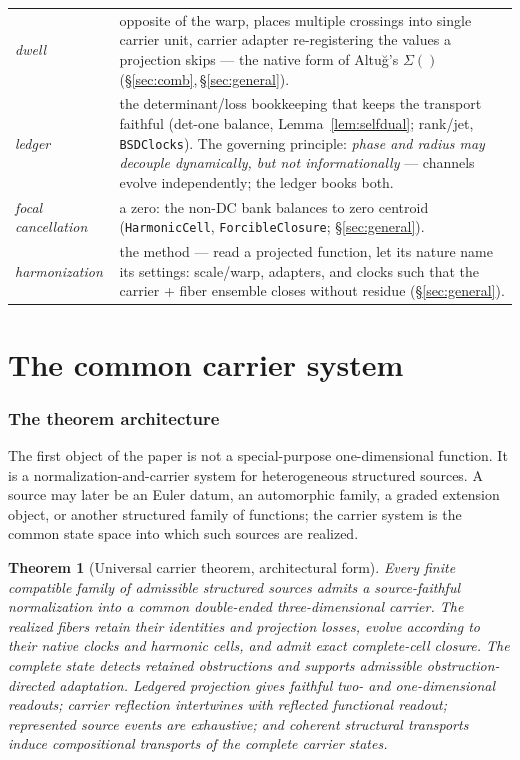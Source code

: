 \documentclass[11pt]{article}
\newtheorem{theorem}{Theorem}
\theoremstyle{definition}
\begin{document}
\begin{center}
\begin{tabular}{@{}lp{}@{}}
\emph{dwell} & opposite of the warp, places multiple crossings into single carrier unit, carrier adapter re-registering the values a projection skips --- the native form of
Altu\u{g}'s $\Sigma()$ (\S\ref{sec:comb},\,\S\ref{sec:general}). \\
\emph{ledger} & the determinant/loss bookkeeping that keeps the transport faithful (det-one balance,
Lemma~\ref{lem:selfdual}; rank/jet, \texttt{BSDClocks}).  The governing principle: \emph{phase and
radius may decouple dynamically, but not informationally} --- channels evolve independently; the
ledger books both. \\
\emph{focal cancellation} & a zero: the non-DC bank balances to zero centroid (\texttt{HarmonicCell},
\texttt{ForcibleClosure}; \S\ref{sec:general}). \\
\emph{harmonization} & the method --- read a projected function, let its nature name its settings: scale/warp, adapters, and clocks such that the carrier + fiber ensemble
closes without residue (\S\ref{sec:general}). \\
\bottomrule
\end{tabular}
\end{center}

\part{The common carrier system}

\section{The theorem architecture}\label{sec:common-carrier-architecture}

The first object of the paper is not a special-purpose one-dimensional
function.  It is a normalization-and-carrier system for heterogeneous
structured sources.  A source may later be an Euler datum, an automorphic
family, a graded extension object, or another structured family of functions;
the carrier system is the common state space into which such sources are
realized.

\begin{theorem}[Universal carrier theorem, architectural form]\label{thm:common-carrier-system}
Every finite compatible family of admissible structured sources admits a
source-faithful normalization into a common double-ended three-dimensional
carrier.  The realized fibers retain their identities and projection losses,
evolve according to their native clocks and harmonic cells, and admit exact
complete-cell closure.  The complete state detects retained obstructions and
supports admissible obstruction-directed adaptation.  Ledgered projection
gives faithful two- and one-dimensional readouts; carrier reflection
intertwines with reflected functional readout; represented source events are
exhaustive; and coherent structural transports induce compositional transports
of the complete carrier states.
\end{theorem}
\end{document}
